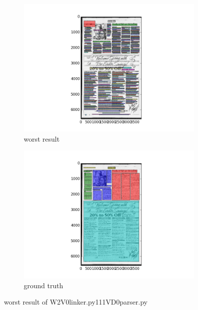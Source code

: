 \documentclass[a4paper,10pt]{article}
\begin{document}
					\begin{figure}
					\centering
					\begin{subfigure}{.5\textwidth}
					  \centering
					  \includegraphics[width=10cm]
					{W2V0linker.py111VD0parser.py.worst.png}
					  \caption{worst result}
					  \label{fig:sub1}
					\end{subfigure}%
					\begin{subfigure}{.5\textwidth}
					  \centering
					  \includegraphics[width=10cm]
					{W2V0linker.py111VD0parser.py.gt.worst.png}
					  \caption{ground truth}
					  \label{fig:sub2}
					\end{subfigure}
					\caption
					{worst result of W2V0linker.py111VD0parser.py}
					\label{fig:test}
					\end{figure}
					
\end{document}
